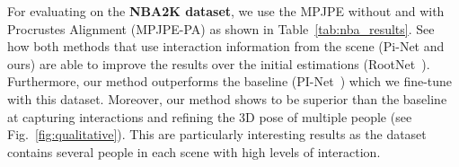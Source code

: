 \begin{table}
\centering
\caption{. We use the \textbf{MPJPE} metric. *This method has been fine-tuned with the same dataset and uses the same initial method (RootNet~\cite{Moon_2019_ICCV_3DMPPE}) for fair comparison.}
\label{tab:nba_results}
\end{table}


%
 
For evaluating on the \textbf{NBA2K dataset}, we use the MPJPE without and with Procrustes Alignment (MPJPE-PA) as shown in Table~\ref{tab:nba_results}. See how both methods that use interaction information from the scene (Pi-Net and ours) are able to improve the results over the initial estimations (RootNet~\cite{Moon_2019_ICCV_3DMPPE}). Furthermore, our method outperforms the baseline (PI-Net~\cite{guo2021pi}) which we fine-tune with this dataset. Moreover, our method shows to be superior than the baseline at capturing interactions and refining the 3D pose of multiple people (see Fig.~\ref{fig:qualitative}). This are particularly interesting results as the dataset contains several people in each scene with high levels of interaction. 














